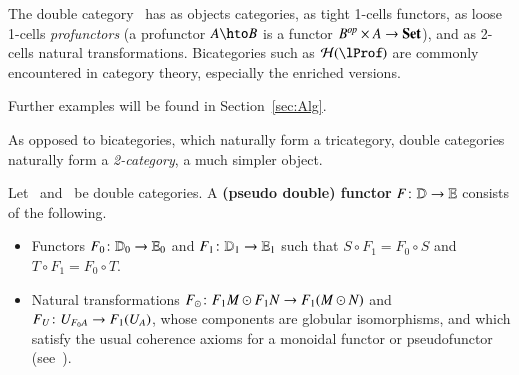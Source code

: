 \begin{eg}
  The double category \lProf\ has as objects categories, as
  tight 1-cells functors, as loose 1-cells \emph{profunctors} (a profunctor
  $A\hto B$ is a functor $B^{\mathit{op}}\times A\to \mathbf{Set}$), and as
  2-cells natural transformations.  Bicategories such as
  $\cH(\lProf)$ are commonly encountered in category theory,
  especially the enriched versions.
\end{eg}

Further examples will be found in Section~\ref{sec:Alg}.


As opposed to bicategories, which naturally form a tricategory, double
categories naturally form a \emph{2-category}, a much simpler object.

\begin{defn}
  Let \lD\ and \lE\ be double categories.  A \textbf{(pseudo double)
    functor} $F \colon \mathbb{D}\to \mathbb{E}$ consists of the following.
  \begin{itemize}
  \item Functors $F_0\colon \mathbb{D}_0 \to \mathbb{E}_0$ and $F_1\colon \mathbb{D}_1 \to
    \mathbb{E}_1$ such that $S\circ F_1 = F_0\circ S$ and $T\circ F_1 =
    F_0\circ T$.
  \item Natural transformations $F_\odot\colon F_1M \odot F_1N \to
    F_1(M\odot N)$ and $F_U\colon U_{F_0 A} \to F_1(U_A)$, whose
    components are globular isomorphisms, and which satisfy the usual
    coherence axioms for a monoidal functor or pseudofunctor
    (see~\cite[\S{}XI.2]{maclane}).
  \end{itemize}
\end{defn}


